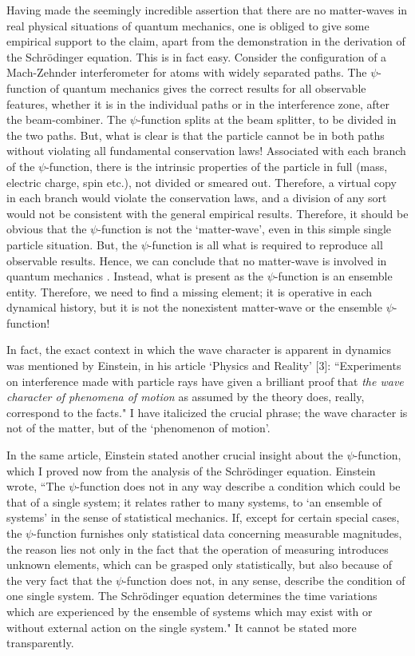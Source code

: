 Having made the seemingly incredible assertion that there are no matter-waves in real
physical situations of quantum mechanics, one is obliged to give some empirical support to
the claim, apart from the demonstration in the derivation of the Schrödinger equation. This
is in fact easy. Consider the configuration of a Mach-Zehnder interferometer for atoms with
widely separated paths. The $\psi$-function of quantum mechanics gives the correct results for
all observable features, whether it is in the individual paths or in the interference zone, after
the beam-combiner. The $\psi$-function splits at the beam splitter, to be divided in the two
paths. But, what is clear is that the particle cannot be in both paths without violating
all fundamental conservation laws! Associated with each branch of the $\psi$-function, there is
the intrinsic properties of the particle in full (mass, electric charge, spin etc.), not divided
or smeared out. Therefore, a virtual copy in each branch would violate the conservation
laws, and a division of any sort would not be consistent with the general empirical results.
Therefore, it should be obvious that the $\psi$-function is not the `matter-wave', even in this
simple single particle situation. But, the $\psi$-function is all what is required to reproduce
all observable results. Hence, we can conclude that no matter-wave is involved in quantum
mechanics \cite{chap14-key2}. Instead, what is present as the $\psi$-function is an ensemble entity. Therefore,
we need to find a missing element; it is operative in each dynamical history, but it is not
the nonexistent matter-wave or the ensemble $\psi$-function!

In fact, the exact context in which the wave character is apparent in dynamics was
mentioned by Einstein, in his article `Physics and Reality' [3]: ``Experiments on interference
made with particle rays have given a brilliant proof that \textit{the wave character of phenomena of
motion} as assumed by the theory does, really, correspond to the facts." I have italicized the
crucial phrase; the wave character is not of the matter, but of the `phenomenon of motion'.

In the same article, Einstein stated another crucial insight about the $\psi$-function, which I
proved now from the analysis of the Schrödinger equation. Einstein wrote, “The $\psi$-function
does not in any way describe a condition which could be that of a single system; it relates
rather to many systems, to `an ensemble of systems' in the sense of statistical mechanics.
If, except for certain special cases, the $\psi$-function furnishes only statistical data concerning
measurable magnitudes, the reason lies not only in the fact that the operation of measuring
introduces unknown elements, which can be grasped only statistically, but also because of
the very fact that the $\psi$-function does not, in any sense, describe the condition of one single
system. The Schr\"{o}dinger equation determines the time variations which are experienced
by the ensemble of systems which may exist with or without external action on the single
system." It cannot be stated more transparently.


